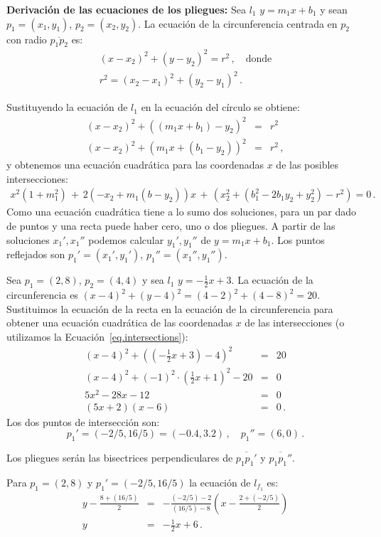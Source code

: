 \noindent\textbf{Derivación de las ecuaciones de los pliegues:}
Sea $l_1$ $y=m_1x + b_1$ y sean $p_1=(x_1,y_1)$, $p_2=(x_2,y_2)$. La ecuación de la circunferencia centrada en $p_2$ con radio $\overline{p_1p_2}$ es:
\begin{eqnarray*}
(x-x_2)^2 + (y-y_2)^2 = r^2\,,\quad \textrm{donde}\\
r^2= (x_2-x_1)^2 + (y_2-y_1)^2\,.
\end{eqnarray*}

Sustituyendo la ecuación de $l_1$ en la ecuación del círculo se obtiene:
\begin{eqnarray*}
(x-x_2)^2+((m_1x+b_1)-y_2)^2&=&r^2\\
(x-x_2)^2+(m_1x+(b_1-y_2))^2&=&r^2\,,
\end{eqnarray*}
y obtenemos una ecuación cuadrática para las coordenadas $x$ de las posibles intersecciones:
\begin{align}
x^2(1+m_1^2) \,+\, 2(-x_2+m_1(b-y_2))x \,+\,(x_2^2 + (b_1^2 - 2b_1y_2+y_2^2)-r^2)=0\,.\label{eq.intersections}
\end{align}
Como una ecuación cuadrática tiene a lo sumo dos soluciones, para un par dado de puntos y una recta puede haber cero, uno o dos pliegues. A partir de las soluciones $x_1',x_1''$ podemos calcular $y_1',y_1''$ de $y=m_1x+b_1$. Los puntos reflejados son $p_1'=(x_1',y_1')$, $p_1''=(x_1'',y_1'')$.
\begin{example}
Sea $p_1=(2,8)$, $p_2=(4,4)$ y sea $l_1$ $y=-\frac{1}{2}x +3$. La ecuación de la circunferencia es $(x-4)^2 + (y-4)^2 = (4-2)^2+(4-8)^2=20$. Sustituimos la ecuación de la recta en la ecuación de la circunferencia para obtener una ecuación cuadrática de las coordenadas $x$ de las intersecciones (o utilizamos la Ecuación~\ref{eq.intersections}):
\begin{eqnarray*}
(x-4)^2 + \left(\left(-\frac{1}{2}x+3\right)-4\right)^2&=&20\\
(x-4)^2 + (-1)^2\cdot\left(\frac{1}{2}x+1\right)^2-20&=&0\\
5x^2 -28x -12&=&0\\
(5x+2)(x-6)&=&0\,.
\end{eqnarray*}
Los dos puntos de intersección son:
\[
p_1'=(-2/5,16/5) = (-0.4,3.2)\,,\quad p_1''=(6,0)\,.
\]
\end{example}
Los pliegues serán las bisectrices perpendiculares de $\overline{p_1p_1'}$ y $\overline{p_1p_1''}$.
\begin{example}
Para $p_1=(2,8)$ y $p_1'=(-2/5,16/5)$ la ecuación de $l_{f_1}$ es:
\begin{eqnarray*}
y-\frac{8+(16/5)}{2}&=&-\frac{(-2/5)-2}{(16/5)-8}\left(x-\frac{2+\left(-2/5\right)}{2}\right)\\
y&=&-\frac{1}{2}x+6\,.
\end{eqnarray*}
\end{example}

